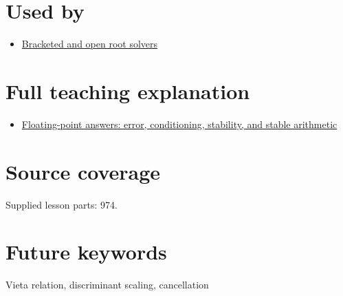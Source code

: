 \section{Used by}\label{appendix-b9afba7f63e5-used-by}

\begin{itemize}
\tightlist
\item
  \hyperref[appendix-f63eb850796d]{Bracketed and open root solvers}
\end{itemize}

\section{Full teaching explanation}\label{appendix-b9afba7f63e5-full-teaching-explanation}

\begin{itemize}
\tightlist
\item
  \href{Continuous\%20Notes/Computing\%20Foundations\%20-\%20From\%20Bits\%20to\%20C++\%20and\%20Systems\%20APIs\#Floating-point\%20answers:\%20error,\%20conditioning,\%20stability,\%20and\%20stable\%20arithmetic}{Floating-point answers: error, conditioning, stability, and stable arithmetic}
\end{itemize}

\section{Source coverage}\label{appendix-b9afba7f63e5-source-coverage}

Supplied lesson parts: 974.

\section{Future keywords}\label{appendix-b9afba7f63e5-future-keywords}

Vieta relation, discriminant scaling, cancellation
